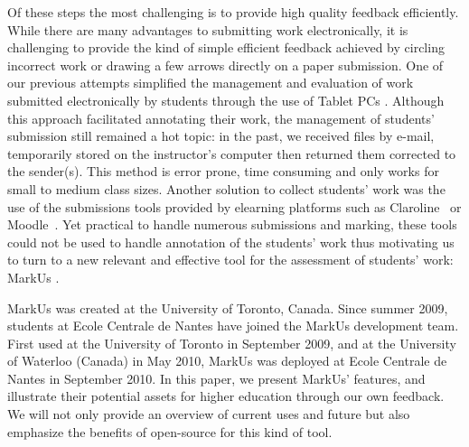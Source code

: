 \documentclass[twocolumn,10pt]{asme2e}
\begin{document}
Of these steps the most challenging is to provide high quality feedback efficiently. While there are many advantages to submitting work electronically, it is challenging to provide the kind of simple efficient feedback achieved by circling incorrect work or drawing a few arrows directly on a paper submission. One of our previous attempts simplified the management and evaluation of work submitted electronically by students through the use of Tablet PCs \cite{magnin-tice-2010}. Although this approach facilitated annotating their work, the management of students' submission still remained a hot topic: in the past, we received files by e-mail, temporarily stored on the instructor's computer then returned them corrected to the sender(s). This method is error prone, time consuming and only works for small to medium class sizes. Another solution to collect students' work was the use of the submissions tools provided by elearning platforms such as Claroline~\cite{claroline} or Moodle~\cite{moodle}. Yet practical to handle numerous submissions and marking, these tools could not be used to handle  annotation of the students' work thus motivating us to turn to a new relevant and effective tool for the assessment of students' work: MarkUs \cite{markus}.

MarkUs was created at the University of Toronto, Canada. Since summer 2009, students at Ecole Centrale de Nantes have joined the MarkUs development team. First used at the University of Toronto in September 2009, and at the University of Waterloo (Canada) in May 2010, MarkUs was deployed at Ecole Centrale de Nantes in September 2010. In this paper, we present MarkUs' features, and illustrate their potential assets for higher education through our own feedback. We will not only provide an overview of current uses and future but also emphasize the benefits of open-source for this kind of tool.
\end{document}
